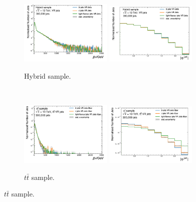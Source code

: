 \begin{figure}[h!]
  \centering
  \begin{subfigure}[b]{0.98\textwidth}
      \centering
      \includegraphics[width=0.48\textwidth]{Images/FTAG/VRDips/JetDist/hspt.png}
      \includegraphics[width=0.48\textwidth]{Images/FTAG/VRDips/JetDist/hseta.png}
      \caption{Hybrid sample.} 
      \label{apfig:vrjetdisth}
  \end{subfigure}\\
  \begin{subfigure}[b]{0.98\textwidth}
      \centering
      \includegraphics[width=0.48\textwidth]{Images/FTAG/VRDips/JetDist/ttpt.png}
      \includegraphics[width=0.48\textwidth]{Images/FTAG/VRDips/JetDist/tteta.png}
      \caption{$t\bar{t}$ sample.} 

\end{subfigure}
\end{figure}
